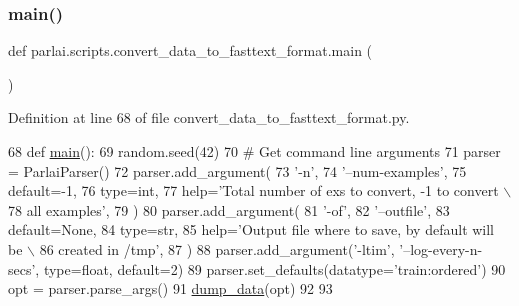 \mbox{\label{namespaceparlai_1_1scripts_1_1convert__data__to__fasttext__format_adef5d250b1de0b6c868a9eb4e699a81f}} 
\subsubsection{\texorpdfstring{main()}{main()}}
{\footnotesize\ttfamily def parlai.\+scripts.\+convert\+\_\+data\+\_\+to\+\_\+fasttext\+\_\+format.\+main (\begin{DoxyParamCaption}{ }\end{DoxyParamCaption})}



Definition at line 68 of file convert\+\_\+data\+\_\+to\+\_\+fasttext\+\_\+format.\+py.


\begin{DoxyCode}
68 \textcolor{keyword}{def }\hyperlink{namespaceparlai_1_1scripts_1_1convert__data__to__fasttext__format_adef5d250b1de0b6c868a9eb4e699a81f}{main}():
69     random.seed(42)
70     \textcolor{comment}{# Get command line arguments}
71     parser = ParlaiParser()
72     parser.add\_argument(
73         \textcolor{stringliteral}{'-n'},
74         \textcolor{stringliteral}{'--num-examples'},
75         default=-1,
76         type=int,
77         help=\textcolor{stringliteral}{'Total number of exs to convert, -1 to convert \(\backslash\)}
78 \textcolor{stringliteral}{                                all examples'},
79     )
80     parser.add\_argument(
81         \textcolor{stringliteral}{'-of'},
82         \textcolor{stringliteral}{'--outfile'},
83         default=\textcolor{keywordtype}{None},
84         type=str,
85         help=\textcolor{stringliteral}{'Output file where to save, by default will be \(\backslash\)}
86 \textcolor{stringliteral}{                                created in /tmp'},
87     )
88     parser.add\_argument(\textcolor{stringliteral}{'-ltim'}, \textcolor{stringliteral}{'--log-every-n-secs'}, type=float, default=2)
89     parser.set\_defaults(datatype=\textcolor{stringliteral}{'train:ordered'})
90     opt = parser.parse\_args()
91     \hyperlink{namespaceparlai_1_1scripts_1_1convert__data__to__fasttext__format_a8222f98bd2353f75b192224da0e07733}{dump\_data}(opt)
92 
93 
\end{DoxyCode}
